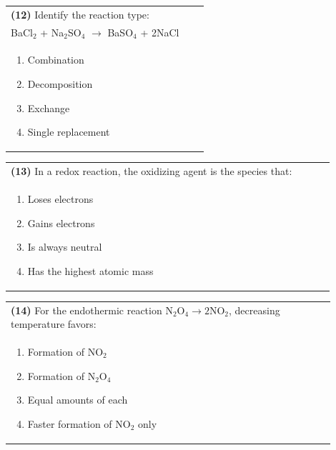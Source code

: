 \documentclass{article}
\begin{document}
\noindent\begin{tabular}{|p{0.9\linewidth}|}
\hline
\textbf{(12)} Identify the reaction type:\\[0.2cm]
BaCl$_2$ + Na$_2$SO$_4$ $\rightarrow$ BaSO$_4$ + 2NaCl\\[0.2cm]
\begin{minipage}[t]{0.85\linewidth}
\begin{enumerate}[label=\alph*.]
\item Combination
\item Decomposition
\item Exchange
\item Single replacement
\end{enumerate}
\end{minipage}\\[0.2cm]
\hline
\end{tabular}
\newpage

\noindent\begin{tabular}{|p{0.9\linewidth}|}
\hline
\textbf{(13)} In a redox reaction, the oxidizing agent is the species that:\\[0.2cm]
\begin{minipage}[t]{0.85\linewidth}
\begin{enumerate}[label=\alph*.]
\item Loses electrons
\item Gains electrons
\item Is always neutral
\item Has the highest atomic mass
\end{enumerate}
\end{minipage}\\[0.2cm]
\hline
\end{tabular}

\noindent\begin{tabular}{|p{0.9\linewidth}|}
\hline
\textbf{(14)} For the endothermic reaction $\text{N}_2\text{O}_4 \rightarrow 2\text{NO}_2$, decreasing temperature favors: \\[0.2cm]
\begin{minipage}[t]{0.85\linewidth}
\begin{enumerate}[label=\alph*.]
\item Formation of NO$_2$
\item Formation of N$_2$O$_4$
\item Equal amounts of each
\item Faster formation of NO$_2$ only
\end{enumerate}
\end{minipage}\\[0.2cm]
\hline
\end{tabular}
\end{document}
